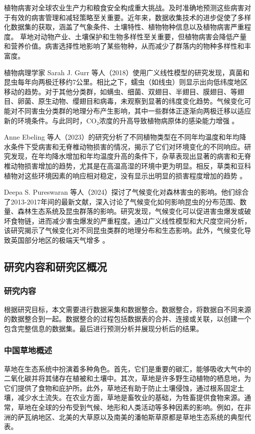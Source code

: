 \documentclass{article}
\begin{document}
	植物病害对全球农业生产力和粮食安全构成重大挑战。及时准确地预测这些病害对于有效的病害管理和减轻策略至关重要。近年来，数据收集技术的进步促使了多样化数据集的获取，涵盖了气象条件、土壤特性、植物物种信息以及植物病害严重程度。
草地对动物产业、土壤保护和生物多样性至关重要，但植物病害会降低产量和营养价值\cite{Chakraborty2018}。病害选择性地影响了某些物种，从而减少了群落内的物种多样性和丰富度\cite{Grunberg2023}。

植物病理学家 Sarah J. Gurr 等人（2018）使用广义线性模型的研究发现，真菌和昆虫每年向两极迁移约7公里。相比之下，蠕虫（如线虫）则显示出向低纬度地区移动的趋势。对于其他分类群，如螨虫、细菌、双翅目、半翅目、膜翅目、等翅目、卵菌、原生动物、缨翅目和病毒，未观察到显著的纬度变化趋势。气候变化可能对不同害虫分类群的地理分布产生影响，其中一些群体正逐渐向两极迁移以适应新的环境条件。与此同时，CO₂浓度的升高导致植物病原体的感染能力增强 \cite{Sukumar2018}。

Anne Ebeling 等人（2023）的研究分析了不同植物类型在不同年均温度和年均降水条件下受病害和无脊椎动物损害的情况，揭示了它们对环境变化的不同响应。研究发现，在年均降水增加和年均温度升高的条件下，杂草表现出显著的病害和无脊椎动物损害增加的趋势，尤其是在高温高湿的环境中更为明显。相反，草类和豆科植物对这些环境因素的响应相对稳定，没有显示出明显的损害程度增加的趋势 \cite{Ebeling2023}。

Deepa S. Pureswaran 等人（2024）探讨了气候变化对森林害虫的影响。他们综合了2013-2017年间的最新文献，深入讨论了气候变化如何影响昆虫的分布范围、数量、森林生态系统及昆虫群落的影响。研究发现，气候变化可以促进害虫爆发或破坏食物链，进而减少害虫爆发的严重程度。通过广义线性模型和大尺度空间分析，该研究揭示了气候变化对不同昆虫类群的地理分布和生态影响。此外，气候变化导致英国部分地区的极端天气增多 \cite{Angelotti2024}。
	\subsection{研究内容和研究区概况}
	
	\subsubsection{研究内容}
	
	根据研究目标，本文需要进行数据采集和数据整合。数据整合，将数据自不同来源的数据整合到一起。数据整合的过程包括数据表的合并、连接或关联，以创建一个包含完整信息的数据集。最后进行预测分析并展现分析后的结果。
	
	\subsubsection{中国草地概述}
	草地在生态系统中扮演着多种角色。首先，它们是重要的碳汇，能够吸收大气中的二氧化碳并将其储存在植被和土壤中。其次，草地是许多野生动植物的栖息地，为它们提供了食物和庇护所。此外，草地还有助于防止土壤侵蚀，通过根系固定土壤，减少水土流失。在农业方面，草地是畜牧业的基础，为牲畜提供食物来源。通常，草地在全球的分布受到气候、地形和人类活动等多种因素的影响。例如，在非洲的萨瓦纳地区、北美的大草原以及南美的潘帕斯草原都是草地生态系统的典型代表。
	
\end{document}
